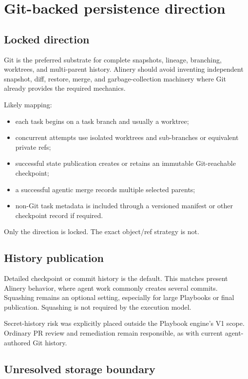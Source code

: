 \documentclass[11pt]{article}
\begin{document}
\section{Git-backed persistence direction}

\subsection{Locked direction}

Git is the preferred substrate for complete snapshots, lineage, branching, worktrees, and multi-parent history. Alinery should avoid inventing independent snapshot, diff, restore, merge, and garbage-collection machinery where Git already provides the required mechanics.

Likely mapping:

\begin{itemize}
  \item each task begins on a task branch and usually a worktree;
  \item concurrent attempts use isolated worktrees and sub-branches or equivalent private refs;
  \item successful state publication creates or retains an immutable Git-reachable checkpoint;
  \item a successful agentic merge records multiple selected parents;
  \item non-Git task metadata is included through a versioned manifest or other checkpoint record if required.
\end{itemize}

Only the direction is locked. The exact object/ref strategy is not.

\subsection{History publication}

Detailed checkpoint or commit history is the default. This matches present Alinery behavior, where agent work commonly creates several commits. Squashing remains an optional setting, especially for large Playbooks or final publication. Squashing is not required by the execution model.

Secret-history risk was explicitly placed outside the Playbook engine's V1 scope. Ordinary PR review and remediation remain responsible, as with current agent-authored Git history.

\subsection{Unresolved storage boundary}
\end{document}
